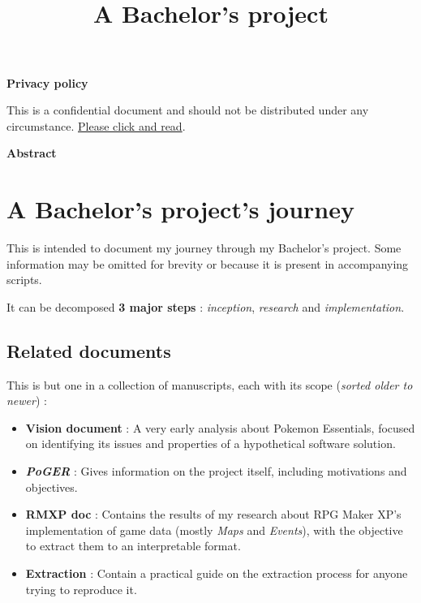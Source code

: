 \documentclass[11pt]{article}
\title{\vspace{15mm}{\HUGE PoGER}\\
	A Bachelor's project}
\author{}
\date{}
\begin{document}
\maketitle

\vspace{90mm}

\textbf{Privacy policy}

This is a confidential document and should not be distributed under any circumstance. \hyperref[sec:privacypolice]{Please click and read}.

\textbf{Abstract}

\lipsum[2-3]


\newpage

\begingroup
\hypersetup{linkcolor=black}
\tableofcontents
\endgroup

\newpage
\section{A Bachelor's project's journey}



This is intended to document my journey through my Bachelor's project. Some information may be omitted for brevity or because it is present in accompanying scripts.

It can be decomposed \textbf{3 major steps} : \textit{inception}, \textit{research} and \textit{implementation}.

\subsection{Related documents}

This is but one in a collection of manuscripts, each with its scope (\textit{sorted older to newer}) :

\begin{itemize}
	
	\item \textbf{Vision document} : A very early analysis about Pokemon Essentials, focused on identifying its issues and properties of a hypothetical software solution.
	
	\item \textbf{\textit{PoGER}} : Gives information on the project itself, including motivations and objectives.
	
	\item \textbf{RMXP doc} : Contains the results of my research about RPG Maker XP's implementation of game data (mostly \textit{Maps} and \textit{Events}), with the objective to extract them to an interpretable format.
	
	\item \textbf{Extraction} : Contain a practical guide on the extraction process for anyone trying to reproduce it.
\end{itemize}
\end{document}
